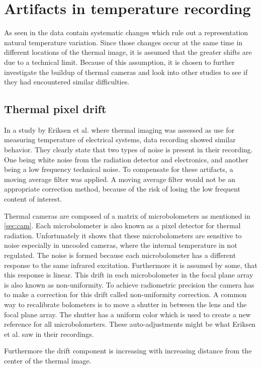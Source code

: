\section{Artifacts in temperature recording}
\label{sec:artifacts}
As seen in  the data contain systematic changes which rule out a representation natural temperature variation. Since those changes occur at the same time in different locations of the thermal image, it is assumed that the greater shifts are due to a technical limit. Because of this assumption, it is chosen to further investigate the buildup of thermal cameras and look into other studies to see if they had encountered similar difficulties.

\subsection{Thermal pixel drift}

In a study by Eriksen et al. where thermal imaging was assessed as use for measuring temperature of electrical systems, data recording showed similar behavior. They clearly state that two types of noise is present in their recording. One being white noise from the radiation detector and electronics, and another being a low frequency technical noise. To compensate for these artifacts, a moving average filter was applied.\cite{eriksen2014} A moving average filter would not be an appropriate correction method, because of the risk of losing the low frequent content of interest. 


Thermal cameras are composed of a matrix of microbolometers as mentioned in \cref{sec:cam}. Each microbolometer is also known as a pixel detector for thermal radiation.\cite{olbrycht2015,wolf2016} Unfortunately it shows that these microbolometers are sensitive to noise especially in uncooled cameras, where the internal temperature in not regulated. The noise is formed because each microbolometer has a different response to the same infrared excitation. Furthermore it is assumed by some, that this response is linear\cite{olbrycht2015}. This drift in each microbolometer in the focal plane array is also known as non-uniformity. To achieve radiometric precision the camera has to make a correction for this drift called non-uniformity correction. A common way to recalibrate bolometers is to move a shutter in between the lens and the focal plane array. The shutter has a uniform color which is used to create a new reference for all microbolometers.\cite{olbrycht2015,wolf2016} These auto-adjustments might be what Eriksen et al. saw in their recordings.

Furthermore the drift component is increasing with increasing distance from the center of the thermal image.\cite{olbrycht2015} 




